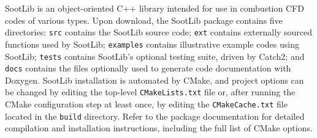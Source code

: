 \documentclass[preprint,letterpaper]{elsarticle}
\begin{document}
SootLib is an object-oriented C++ library intended for use in combustion CFD codes of various types.
Upon download, the SootLib package contains five directories: \texttt{src} contains the SootLib source code; \texttt{ext} contains externally sourced functions used by SootLib; \texttt{examples} contains illustrative example codes using SootLib; \texttt{tests} contains SootLib's optional testing suite, driven by Catch2; and \texttt{docs} contains the files optionally used to generate code documentation with Doxygen.
SootLib installation is automated by CMake, and project options can be changed by editing the top-level \texttt{CMakeLists.txt} file or, after running the CMake configuration step at least once, by editing the \texttt{CMakeCache.txt} file located in the \texttt{build} directory. Refer to the package documentation for detailed compilation and installation instructions, including the full list of CMake options.
\end{document}
